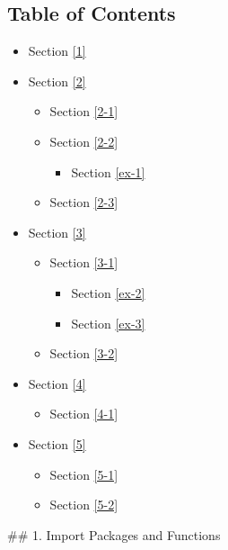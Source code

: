 \documentclass[11pt]{article}
\providecommand{\tightlist}{%
      \setlength{\itemsep}{0pt}\setlength{\parskip}{0pt}}
\begin{document}
    \hypertarget{table-of-contents}{%
\subsection{Table of Contents}\label{table-of-contents}}

\begin{itemize}
\tightlist
\item
  Section \ref{1}
\item
  Section \ref{2}

  \begin{itemize}
  \tightlist
  \item
    Section \ref{2-1}
  \item
    Section \ref{2-2}

    \begin{itemize}
    \tightlist
    \item
      Section \ref{ex-1}
    \end{itemize}
  \item
    Section \ref{2-3}
  \end{itemize}
\item
  Section \ref{3}

  \begin{itemize}
  \tightlist
  \item
    Section \ref{3-1}

    \begin{itemize}
    \tightlist
    \item
      Section \ref{ex-2}
    \item
      Section \ref{ex-3}
    \end{itemize}
  \item
    Section \ref{3-2}
  \end{itemize}
\item
  Section \ref{4}

  \begin{itemize}
  \tightlist
  \item
    Section \ref{4-1}
  \end{itemize}
\item
  Section \ref{5}

  \begin{itemize}
  \tightlist
  \item
    Section \ref{5-1}
  \item
    Section \ref{5-2}
  \end{itemize}
\end{itemize}

     \#\# 1. Import Packages and Functions
\end{document}
